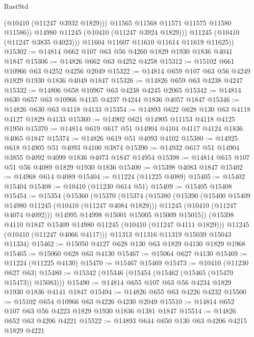 \begin{lexlean}{RustStd}
\begin{coremodule}
                  (@10410 (@11247 @3932 @1829)))
                @11565
                @11568
                @11571
                @11575
                @11580
                @11586))
            @14980
            @11245
            (@10410 (@11247 @3924 @1829)))
          @11245
          (@10410 (@11247 @3835 @4023)))
        @11604
        @11607
        @11610
        @11614
        @11619
        @11625))
@15302 := @14814 @662 @107 @63 @56 @4260 @1829 @1930 @1836 @4041 @1847
@15306 := @14826 @662 @63 @4252 @4258
@15312 := @15102 @661 @10966 @63 @4252 @4256 @2049
@15322 := @14814 @659 @107 @63 @56 @4249 @1829 @1930 @1836 @4049 @1847
@15326 := @14826 @659 @63 @4238 @4247
@15332 := @14806 @658 @10967 @63 @4238 @4245 @2065
@15342 := @14814 @630 @657 @63 @10966 @4135 @4237 @4244 @1836 @4057 @1847
@15346 := @14826 @630 @63 @4118 @4133
@15354 := @14893 @622 @628 @130 @63 @4118 @4127 @1829 @4133
@15360 := @14902 @621 @14905 @11153 @4118 @4125 @1950
@15370 := @14814 @619 @617 @51 @14904 @4104 @4117 @4124 @1836 @4065 @1847
@15374 := @14826 @619 @51 @4093 @4102
@15380 := @14925 @618 @14905 @51 @4093 @4100 @3874
@15390 := @14932 @617 @51 @14904 @3855 @4092 @4099 @1836 @4073 @1847 @14954
@15398 := @14814 @615 @107 @51 @56 @4089 @1829 @1930 @1836
@15400 := @15398 @4083 @1847
@15402 := @14968 @614 @4089
@15404 := @11224 (@11225 @4089)
@15405 := @15402 @15404
@15408 := @10410 (@11230 @614 @51)
@15409 := @15405 @15408
@15454 := @15354
    (@15360
      (@15370
        (@15374
          (@15380
            (@15390
              (@15400 @15409 @14980 @11245 (@10410 (@11247 @4084 @1829)))
              @11245
              (@10410 (@11247 @4074 @4092)))
            @14995
            @14998
            @15001
            @15005
            @15009
            @15015))
        (@15398 @4110 @1847 @15409 @14980 @11245 (@10410 (@11247 @4111 @1829)))
        @11245
        (@10410 (@11247 @4066 @4117)))
      @11313
      @11316
      @11319
      @15039
      @15043
      @11334)
@15462 := @15050 @4127 @628 @130 @63 @1829 @4130 @1829 @1968
@15465 := @15060 @628 @63 @4130
@15467 := @15064 @627 @4130
@15469 := @11224 (@11225 @4130)
@15470 := @15467 @15469
@15473 := @10410 (@11230 @627 @63)
@15480 := @15342 (@15346 (@15454 (@15462 (@15465 (@15470 @15473)) @15083)))
@15490 := @14814 @655 @107 @63 @56 @4234 @1829 @1930 @1836 @4141 @1847
@15494 := @14826 @655 @63 @4226 @4232
@15500 := @15102 @654 @10966 @63 @4226 @4230 @2049
@15510 := @14814 @652 @107 @63 @56 @4223 @1829 @1930 @1836 @1381 @1847
@15514 := @14826 @652 @63 @4206 @4221
@15522 := @14893 @644 @650 @130 @63 @4206 @4215 @1829 @4221

\end{coremodule}
\end{lexlean}
